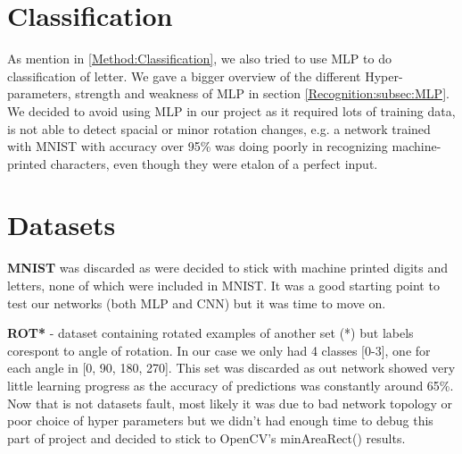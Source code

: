\documentclass[Report.tex]{subfiles}
\begin{document}
\section{Classification}
\label{sec:Discarded Method:Classification}

\begin{flushleft}
  As mention in \ref{Method:Classification}, we also tried to use MLP to do classification of letter. We gave a bigger overview of the different Hyper-parameters, strength and weakness of MLP in section \ref{Recognition:subsec:MLP}. 
  We decided to avoid using MLP in our project as it required lots of training data, is not able to detect spacial or minor rotation changes, e.g. a network trained with MNIST with accuracy over 95\% was doing poorly in recognizing machine-printed characters, even though they were etalon of a perfect input.

\end{flushleft}

\section{Datasets}
\begin{flushleft}
\textbf{MNIST} was discarded as were decided to stick with machine printed digits and letters, none of which were included in MNIST. It was a good starting point to test our networks (both MLP and CNN) but it was time to move on.

\par
\textbf{ROT*} - dataset containing rotated examples of another set (*) but labels corespont to angle of rotation. In our case we only had 4 classes [0-3], one for each angle in [0, 90, 180, 270].
This set was discarded as out network showed very little learning progress as the accuracy of predictions was constantly around 65\%. Now that is not datasets fault, most likely it was due to bad network topology or poor choice of hyper parameters but we didn't had enough time to debug this part of project and decided to stick to OpenCV's minAreaRect() results.


\end{flushleft}
\end{document}
